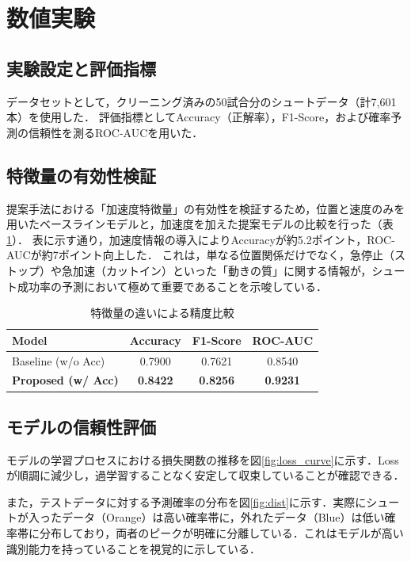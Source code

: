 \documentclass{jarticle}
\begin{document}
\section{数値実験}
\subsection{実験設定と評価指標}
データセットとして，クリーニング済みの50試合分のシュートデータ（計7,601本）を使用した．
評価指標としてAccuracy（正解率），F1-Score，および確率予測の信頼性を測るROC-AUCを用いた．

\subsection{特徴量の有効性検証}
提案手法における「加速度特徴量」の有効性を検証するため，位置と速度のみを用いたベースラインモデルと，加速度を加えた提案モデルの比較を行った（表\ref{tab:comparison}）．
表に示す通り，加速度情報の導入によりAccuracyが約5.2ポイント，ROC-AUCが約7ポイント向上した．
これは，単なる位置関係だけでなく，急停止（ストップ）や急加速（カットイン）といった「動きの質」に関する情報が，シュート成功率の予測において極めて重要であることを示唆している．

\begin{table}[tb]
 \centering
 \caption{特徴量の違いによる精度比較}
 \label{tab:comparison}
 \begin{tabular}{lccc}
  \hline
  Model & Accuracy & F1-Score & ROC-AUC \\
  \hline
  Baseline (w/o Acc) & 0.7900 & 0.7621 & 0.8540 \\
  \textbf{Proposed (w/ Acc)} & \textbf{0.8422} & \textbf{0.8256} & \textbf{0.9231} \\
  \hline
 \end{tabular}
\end{table}

\subsection{モデルの信頼性評価}
モデルの学習プロセスにおける損失関数の推移を図\ref{fig:loss_curve}に示す．Lossが順調に減少し，過学習することなく安定して収束していることが確認できる．

また，テストデータに対する予測確率の分布を図\ref{fig:dist}に示す．実際にシュートが入ったデータ（Orange）は高い確率帯に，外れたデータ（Blue）は低い確率帯に分布しており，両者のピークが明確に分離している．これはモデルが高い識別能力を持っていることを視覚的に示している．
\end{document}
